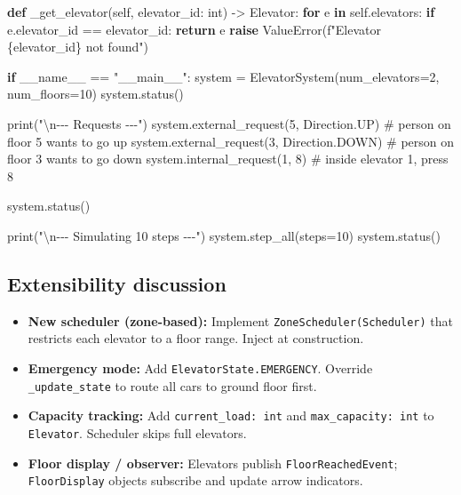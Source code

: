 \documentclass[11pt]{article}
\providecommand{\tightlist}{\setlength{\itemsep}{1pt}\setlength{\parskip}{0pt}}
\newenvironment{Shaded}{\begin{snugshade}}{\end{snugshade}}
\newcommand{\BuiltInTok}[1]{\textcolor[rgb]{0.50,0.55,0.55}{#1}}
\newcommand{\CharTok}[1]{\textcolor[rgb]{0.24,0.68,0.91}{#1}}
\newcommand{\CommentTok}[1]{\textcolor[rgb]{0.48,0.49,0.49}{#1}}
\newcommand{\ControlFlowTok}[1]{\textcolor[rgb]{0.99,0.74,0.29}{\textbf{#1}}}
\newcommand{\DecValTok}[1]{\textcolor[rgb]{0.96,0.45,0.00}{#1}}
\newcommand{\KeywordTok}[1]{\textcolor[rgb]{0.81,0.81,0.76}{\textbf{#1}}}
\newcommand{\NormalTok}[1]{\textcolor[rgb]{0.81,0.81,0.76}{#1}}
\newcommand{\OperatorTok}[1]{\textcolor[rgb]{0.81,0.81,0.76}{#1}}
\newcommand{\PreprocessorTok}[1]{\textcolor[rgb]{0.15,0.68,0.38}{#1}}
\newcommand{\SpecialCharTok}[1]{\textcolor[rgb]{0.24,0.68,0.91}{#1}}
\newcommand{\SpecialStringTok}[1]{\textcolor[rgb]{0.85,0.27,0.33}{#1}}
\newcommand{\StringTok}[1]{\textcolor[rgb]{0.96,0.31,0.31}{#1}}
\newcommand{\VariableTok}[1]{\textcolor[rgb]{0.15,0.68,0.68}{#1}}
\begin{document}
\begin{Shaded}
\begin{Highlighting}[]
    \KeywordTok{def}\NormalTok{ \_get\_elevator(}\VariableTok{self}\NormalTok{, elevator\_id: }\BuiltInTok{int}\NormalTok{) }\OperatorTok{{-}\textgreater{}}\NormalTok{ Elevator:}
        \ControlFlowTok{for}\NormalTok{ e }\KeywordTok{in} \VariableTok{self}\NormalTok{.elevators:}
            \ControlFlowTok{if}\NormalTok{ e.elevator\_id }\OperatorTok{==}\NormalTok{ elevator\_id:}
                \ControlFlowTok{return}\NormalTok{ e}
        \ControlFlowTok{raise} \PreprocessorTok{ValueError}\NormalTok{(}\SpecialStringTok{f"Elevator }\SpecialCharTok{\{}\NormalTok{elevator\_id}\SpecialCharTok{\}}\SpecialStringTok{ not found"}\NormalTok{)}


\ControlFlowTok{if} \VariableTok{\_\_name\_\_} \OperatorTok{==} \StringTok{"\_\_main\_\_"}\NormalTok{:}
\NormalTok{    system }\OperatorTok{=}\NormalTok{ ElevatorSystem(num\_elevators}\OperatorTok{=}\DecValTok{2}\NormalTok{, num\_floors}\OperatorTok{=}\DecValTok{10}\NormalTok{)}
\NormalTok{    system.status()}

    \BuiltInTok{print}\NormalTok{(}\StringTok{"}\CharTok{\textbackslash{}n}\StringTok{{-}{-}{-} Requests {-}{-}{-}"}\NormalTok{)}
\NormalTok{    system.external\_request(}\DecValTok{5}\NormalTok{, Direction.UP)   }\CommentTok{\# person on floor 5 wants to go up}
\NormalTok{    system.external\_request(}\DecValTok{3}\NormalTok{, Direction.DOWN)  }\CommentTok{\# person on floor 3 wants to go down}
\NormalTok{    system.internal\_request(}\DecValTok{1}\NormalTok{, }\DecValTok{8}\NormalTok{)              }\CommentTok{\# inside elevator 1, press 8}

\NormalTok{    system.status()}

    \BuiltInTok{print}\NormalTok{(}\StringTok{"}\CharTok{\textbackslash{}n}\StringTok{{-}{-}{-} Simulating 10 steps {-}{-}{-}"}\NormalTok{)}
\NormalTok{    system.step\_all(steps}\OperatorTok{=}\DecValTok{10}\NormalTok{)}
\NormalTok{    system.status()}
\end{Highlighting}
\end{Shaded}

\subsection{Extensibility discussion}\label{extensibility-discussion-4}

\begin{itemize}
\tightlist
\item
  \textbf{New scheduler (zone-based):} Implement \texttt{ZoneScheduler(Scheduler)} that restricts each elevator to a floor range. Inject at construction.
\item
  \textbf{Emergency mode:} Add \texttt{ElevatorState.EMERGENCY}. Override \texttt{\_update\_state} to route all cars to ground floor first.
\item
  \textbf{Capacity tracking:} Add \texttt{current\_load:\ int} and \texttt{max\_capacity:\ int} to \texttt{Elevator}. Scheduler skips full elevators.
\item
  \textbf{Floor display / observer:} Elevators publish \texttt{FloorReachedEvent}; \texttt{FloorDisplay} objects subscribe and update arrow indicators.
\end{itemize}
\end{document}
